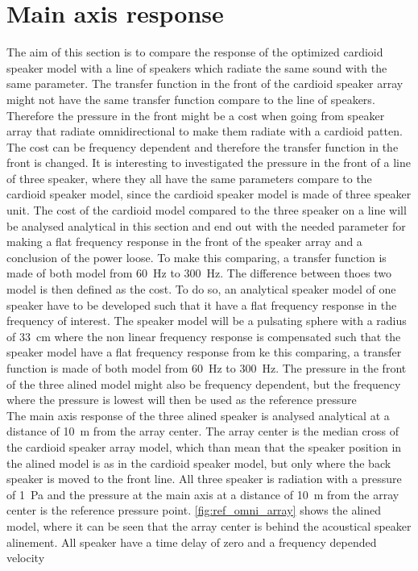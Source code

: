 \section{Main axis response}
The aim of this section is to compare the response of the optimized cardioid speaker model with a line of speakers which radiate the same sound with the same parameter. The transfer function in the front of the cardioid speaker array might not have the same transfer function compare to the line of speakers. Therefore the pressure in the front might be a cost when going from speaker array that radiate omnidirectional to make them radiate with a cardioid patten. The cost can be frequency dependent and therefore the transfer function in the front is changed. It is interesting to investigated the pressure in the front of a line of three speaker, where they all have the same parameters compare to the cardioid speaker model, since the cardioid speaker model is made of three speaker unit. The cost of the cardioid model compared to the three speaker on a line will be analysed analytical in this section and end out with the needed parameter for making a flat frequency response in the front of the speaker array and a conclusion of the power loose. To make this comparing, a transfer function is made of both model from \SI{60}{\hertz} to \SI{300}{\hertz}. The difference between thoes two model is then defined as the cost. To do so, an analytical speaker model of one speaker have to be developed such that it have a flat frequency response in the frequency of interest. The speaker model will be a pulsating sphere with a radius of \SI{33}{\centi\meter} where the non linear frequency response is compensated such that the speaker model have a flat frequency response from  ke this comparing, a transfer function is made of both model from \SI{60}{\hertz} to \SI{300}{\hertz}. The pressure in the front of the three alined model might also be frequency dependent, but the frequency where the pressure is lowest will then be used as the reference pressure \\

The main axis response of the three alined speaker is analysed analytical at a distance of \SI{10}{\meter} from the array center. The array center is the median cross of the cardioid speaker array model, which than mean that the speaker position in the alined model is as in the cardioid speaker model, but only where the back speaker is moved to the front line. All three speaker is radiation with a pressure of \SI{1}{\pascal} and the pressure at the main axis at a distance of \SI{10}{\meter} from the array center is the reference pressure point. \autoref{fig:ref_omni_array} shows the alined model, where it can be seen that the array center is behind the acoustical speaker alinement. All speaker have a time delay of zero and a frequency depended velocity 

